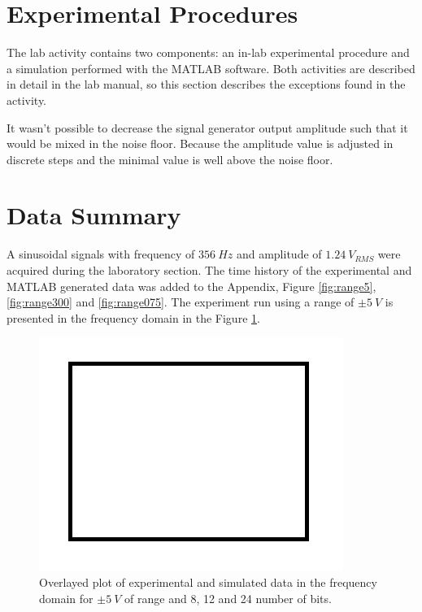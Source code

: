 \documentclass[10pt,letterpaper,twocolumn]{article}
\begin{document}
\section{Experimental Procedures}
    The lab activity contains two components: an in-lab experimental procedure and a simulation performed with the MATLAB software. Both activities are described in detail in the lab manual, so this section describes the exceptions found in the activity.
    
    It wasn't possible to decrease the signal generator output amplitude such that it would be mixed in the noise floor. Because the amplitude value is adjusted in discrete steps and the minimal value is well above the noise floor.


\section{Data Summary}
    A sinusoidal signals with frequency of $356\ Hz$ and amplitude of $1.24\ V_{RMS}$ were acquired during the laboratory section. The time history of the experimental and MATLAB generated data was added to the Appendix, Figure \ref{fig:range5}, \ref{fig:range300} and \ref{fig:range075}. The experiment run using a range of $\pm 5\ V$ is presented in the frequency domain in the Figure \ref{fig:spectral5}.
    
    \begin{figure}[h]
        \centering
        \includegraphics[width=0.8\linewidth]{img/sample.png}
        \caption{Overlayed plot of experimental and simulated data in the frequency domain for $\pm 5\ V$ of range and 8, 12 and 24 number of bits.}
        \label{fig:spectral5}
    \end{figure}
\end{document}
